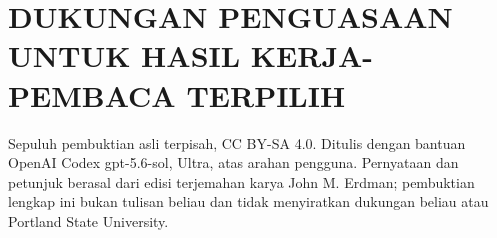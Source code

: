 
\chapter{DUKUNGAN PENGUASAAN UNTUK HASIL KERJA-PEMBACA TERPILIH}

\begin{center}
\small
Sepuluh pembuktian asli terpisah, CC BY-SA 4.0. Ditulis dengan bantuan
OpenAI Codex gpt-5.6-sol, Ultra, atas arahan pengguna. Pernyataan dan petunjuk
berasal dari edisi terjemahan karya John M. Erdman; pembuktian lengkap ini
bukan tulisan beliau dan tidak menyiratkan dukungan beliau atau Portland State
University.
\end{center}

